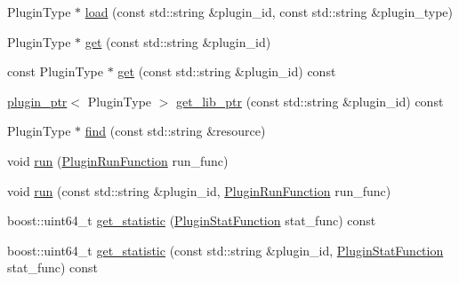 \begin{DoxyCompactItemize}
Plugin\-Type $\ast$ \hyperlink{classpion_1_1plugin__manager_a3e03e5f6023f530c91464b766b2fab9e}{load} (const std\-::string \&plugin\-\_\-id, const std\-::string \&plugin\-\_\-type)
\item 
Plugin\-Type $\ast$ \hyperlink{classpion_1_1plugin__manager_a348da20310edf84242a2688ddc1639e9}{get} (const std\-::string \&plugin\-\_\-id)
\item 
const Plugin\-Type $\ast$ \hyperlink{classpion_1_1plugin__manager_a716a150691df75fb46d1f472e3eda2f6}{get} (const std\-::string \&plugin\-\_\-id) const 
\item 
\hyperlink{classpion_1_1plugin__ptr}{plugin\-\_\-ptr}$<$ Plugin\-Type $>$ \hyperlink{classpion_1_1plugin__manager_abb0ab4f0a27e5739682430b8a6d06f15}{get\-\_\-lib\-\_\-ptr} (const std\-::string \&plugin\-\_\-id) const 
\item 
Plugin\-Type $\ast$ \hyperlink{classpion_1_1plugin__manager_ab58061848dde1682a7c013c7f468d191}{find} (const std\-::string \&resource)
\item 
void \hyperlink{classpion_1_1plugin__manager_a1c2f6105acfcfcf1b742aecab122a368}{run} (\hyperlink{classpion_1_1plugin__manager_a275b88a2c9f7c89d6d737c1b444be8b2}{Plugin\-Run\-Function} run\-\_\-func)
\item 
void \hyperlink{classpion_1_1plugin__manager_af530db568a45e50b3d8b06976c13d994}{run} (const std\-::string \&plugin\-\_\-id, \hyperlink{classpion_1_1plugin__manager_a275b88a2c9f7c89d6d737c1b444be8b2}{Plugin\-Run\-Function} run\-\_\-func)
\item 
boost\-::uint64\-\_\-t \hyperlink{classpion_1_1plugin__manager_a40b42b430ba69d4f0143c04ceed81f57}{get\-\_\-statistic} (\hyperlink{classpion_1_1plugin__manager_a1e6a4223438c74e4e928401f734d2e0c}{Plugin\-Stat\-Function} stat\-\_\-func) const 
\item 
boost\-::uint64\-\_\-t \hyperlink{classpion_1_1plugin__manager_a9a569d4782392bf94a0faed3143eedd4}{get\-\_\-statistic} (const std\-::string \&plugin\-\_\-id, \hyperlink{classpion_1_1plugin__manager_a1e6a4223438c74e4e928401f734d2e0c}{Plugin\-Stat\-Function} stat\-\_\-func) const 
\end{DoxyCompactItemize}
